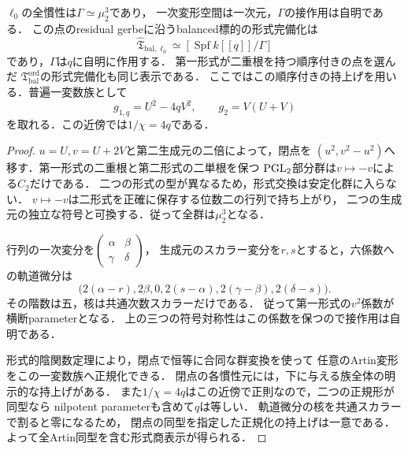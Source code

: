 \begin{proposition}[線束境界点の慣性と形式変形]
\label{prop:qa-fricke-line-formal-target}
$\ell_0$の全慣性は$\Gamma\simeq\mu_2^3$であり，
一次変形空間は一次元，$\Gamma$の接作用は自明である．
この点のresidual gerbeに沿うbalanced標的の形式完備化は
\[
 \widehat{\mathfrak T}_{\mathrm{bal},\ell_0}
 \simeq[\operatorname{Spf}k[[q]]/\Gamma]
\]
であり，$\Gamma$は$q$に自明に作用する．
第一形式が二重根を持つ順序付きの点を選んだ
$\mathfrak T_{\mathrm{bal}}^{\mathrm{ord}}$の形式完備化も同じ表示である．
ここではこの順序付きの持上げを用いる．普遍一変数族として
\[
 g_{1,q}=U^2-4qV^2,\qquad g_2=V(U+V)
\]
を取れる．この近傍では$1/\chi=4q$である．
\end{proposition}
\begin{proof}
$u=U,v=U+2V$と第二生成元の二倍によって，閉点を
$(u^2,v^2-u^2)$へ移す．第一形式の二重根と第二形式の二単根を保つ
$\operatorname{PGL}_2$部分群は$v\mapsto-v$による$C_2$だけである．
二つの形式の型が異なるため，形式交換は安定化群に入らない．
$v\mapsto-v$は二形式を正確に保存する位数二の行列で持ち上がり，
二つの生成元の独立な符号と可換する．従って全群は$\mu_2^3$となる．

行列の一次変分を$\left(\begin{smallmatrix}\alpha&\beta\\\gamma&\delta\end{smallmatrix}\right)$，
生成元のスカラー変分を$r,s$とすると，六係数への軌道微分は
\[
 \bigl(2(\alpha-r),2\beta,0,
       2(s-\alpha),2(\gamma-\beta),2(\delta-s)\bigr).
\]
その階数は五，核は共通次数スカラーだけである．
従って第一形式の$v^2$係数が横断parameterとなる．
上の三つの符号対称性はこの係数を保つので接作用は自明である．

形式的陰関数定理により，閉点で恒等に合同な群変換を使って
任意のArtin変形をこの一変数族へ正規化できる．
閉点の各慣性元には，下に与える族全体の明示的な持上げがある．
また$1/\chi=4q$はこの近傍で正則なので，二つの正規形が同型なら
nilpotent parameterも含めて$q$は等しい．
軌道微分の核を共通スカラーで割ると零になるため，
閉点の同型を指定した正規化の持上げは一意である．
よって全Artin同型を含む形式商表示が得られる．
\end{proof}

